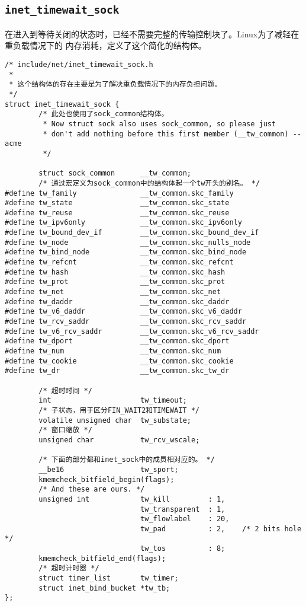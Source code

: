 \subsection{\texttt{inet_timewait_sock}}
\label{subsec:inet_timewait_sock}
在进入到等待关闭的状态时，已经不需要完整的传输控制块了。Linux为了减轻在重负载情况下的
内存消耗，定义了这个简化的结构体。
\begin{verbatim}
/* include/net/inet_timewait_sock.h
 *
 * 这个结构体的存在主要是为了解决重负载情况下的内存负担问题。
 */
struct inet_timewait_sock {
        /* 此处也使用了sock_common结构体。
         * Now struct sock also uses sock_common, so please just
         * don't add nothing before this first member (__tw_common) --acme
         */

        struct sock_common      __tw_common;
        /* 通过宏定义为sock_common中的结构体起一个tw开头的别名。 */
#define tw_family               __tw_common.skc_family
#define tw_state                __tw_common.skc_state
#define tw_reuse                __tw_common.skc_reuse
#define tw_ipv6only             __tw_common.skc_ipv6only
#define tw_bound_dev_if         __tw_common.skc_bound_dev_if
#define tw_node                 __tw_common.skc_nulls_node
#define tw_bind_node            __tw_common.skc_bind_node
#define tw_refcnt               __tw_common.skc_refcnt
#define tw_hash                 __tw_common.skc_hash
#define tw_prot                 __tw_common.skc_prot
#define tw_net                  __tw_common.skc_net
#define tw_daddr                __tw_common.skc_daddr
#define tw_v6_daddr             __tw_common.skc_v6_daddr
#define tw_rcv_saddr            __tw_common.skc_rcv_saddr
#define tw_v6_rcv_saddr         __tw_common.skc_v6_rcv_saddr
#define tw_dport                __tw_common.skc_dport
#define tw_num                  __tw_common.skc_num
#define tw_cookie               __tw_common.skc_cookie
#define tw_dr                   __tw_common.skc_tw_dr

        /* 超时时间 */
        int                     tw_timeout; 
        /* 子状态，用于区分FIN_WAIT2和TIMEWAIT */
        volatile unsigned char  tw_substate; 
        /* 窗口缩放 */
        unsigned char           tw_rcv_wscale;

        /* 下面的部分都和inet_sock中的成员相对应的。 */
        __be16                  tw_sport;
        kmemcheck_bitfield_begin(flags);
        /* And these are ours. */
        unsigned int            tw_kill         : 1,
                                tw_transparent  : 1,
                                tw_flowlabel    : 20,   
                                tw_pad          : 2,    /* 2 bits hole */
                                tw_tos          : 8;
        kmemcheck_bitfield_end(flags);
        /* 超时计时器 */
        struct timer_list       tw_timer;
        struct inet_bind_bucket *tw_tb;
};
\end{verbatim}

